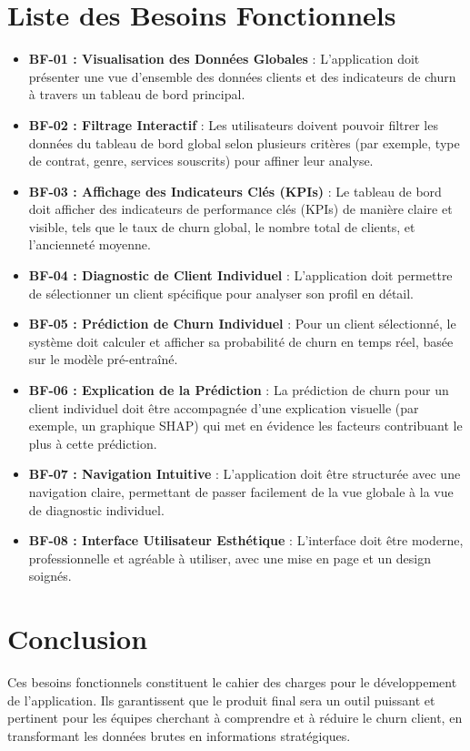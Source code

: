 \section{Liste des Besoins Fonctionnels}
\begin{itemize}
    \item \textbf{BF-01 : Visualisation des Données Globales} : L'application doit présenter une vue d'ensemble des données clients et des indicateurs de churn à travers un tableau de bord principal.
    
    \item \textbf{BF-02 : Filtrage Interactif} : Les utilisateurs doivent pouvoir filtrer les données du tableau de bord global selon plusieurs critères (par exemple, type de contrat, genre, services souscrits) pour affiner leur analyse.
    
    \item \textbf{BF-03 : Affichage des Indicateurs Clés (KPIs)} : Le tableau de bord doit afficher des indicateurs de performance clés (KPIs) de manière claire et visible, tels que le taux de churn global, le nombre total de clients, et l'ancienneté moyenne.
    
    \item \textbf{BF-04 : Diagnostic de Client Individuel} : L'application doit permettre de sélectionner un client spécifique pour analyser son profil en détail.
    
    \item \textbf{BF-05 : Prédiction de Churn Individuel} : Pour un client sélectionné, le système doit calculer et afficher sa probabilité de churn en temps réel, basée sur le modèle pré-entraîné.
    
    \item \textbf{BF-06 : Explication de la Prédiction} : La prédiction de churn pour un client individuel doit être accompagnée d'une explication visuelle (par exemple, un graphique SHAP) qui met en évidence les facteurs contribuant le plus à cette prédiction.
    
    \item \textbf{BF-07 : Navigation Intuitive} : L'application doit être structurée avec une navigation claire, permettant de passer facilement de la vue globale à la vue de diagnostic individuel.
    
    \item \textbf{BF-08 : Interface Utilisateur Esthétique} : L'interface doit être moderne, professionnelle et agréable à utiliser, avec une mise en page et un design soignés.
\end{itemize}

\section{Conclusion}
Ces besoins fonctionnels constituent le cahier des charges pour le développement de l'application. Ils garantissent que le produit final sera un outil puissant et pertinent pour les équipes cherchant à comprendre et à réduire le churn client, en transformant les données brutes en informations stratégiques.

